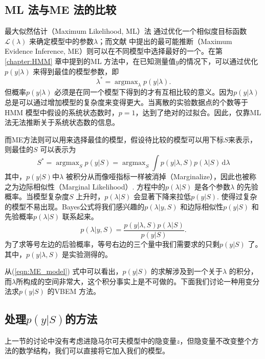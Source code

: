 \documentclass[11pt, a4paper]{article}
\DeclareMathOperator*{\argmax}{argmax}
\begin{document}
    \subsection{ML 法与ME 法的比较}
    最大似然估计（Maximum Likelihood, ML）法\cite{wiki:mle} 通过优化一个相似度目标函数$\mathcal L(\lambda)$ 来确定模型中的参数$\lambda$；而文献\cite{VBEM} 中提出的最可能推断（Maximum Evidence Inference, ME）则可以在不同模型中选择最好的一个。在第\ref{chapter:HMM} 章中提到的ML 方法中，在已知测量值$y$的情况下，可以通过优化$p(y|\lambda)$ 来得到最佳的模型参数，即
    \begin{equation}\label{eqn:ML_estimate}
      \lambda^* = \argmax_\lambda p(y| \lambda).
    \end{equation}
    但概率$p(y|\lambda)$ 必须是在同一个模型下得到的才有互相比较的意义。因为$p(y|\lambda)$ 总是可以通过增加模型的复杂度来变得更大。当离散的实验数据点的个数等于HMM 模型中假设的系统状态数时，$p=1$，达到了绝对的过拟合。因此，仅靠ML 法无法推断关于系统状态数的信息。

    而ME方法则可以用来选择最佳的模型，假设待比较的模型可以用下标$S$来表示，则最佳的$S$ 可以表示为
    \begin{equation}\label{eqn:ME_model}
      S^* = \argmax_S p(y| S) = \argmax_S \int p(y| \lambda, S)p(\lambda| S)\,\mathrm d\lambda
    \end{equation}
    其中，$p(y| S)$中$\lambda$ 被积分从而像哑指标一样被消掉（Marginalize），因此也被称之为边际相似性（Marginal Likelihood）. 方程中的$p(\lambda | S)$ 是各个参数$\lambda$ 的先验概率。当模型复杂度$S$ 上升时，$p(\lambda | S)$ 会显著下降来拉低$p(y| S)$. 使得过复杂的模型不易出现。Bayes公式将我们感兴趣的$p(\lambda|y,S)$ 和边际相似性$p(y|S)$ 和先验概率$p(\lambda|S)$ 联系起来。
    \begin{equation}\label{eqn:bayes_vbem}
      p(\lambda| y, S) = \frac{p(y| \lambda, S)p(\lambda| S)}{p(y| S)}.
    \end{equation}
    为了求等号左边的后验概率，等号右边的三个量中我们需要求的只剩$p(y| S)$ 了。其中，$p(y| \lambda, S)$ 是实验测得的。

    从(\ref{eqn:ME_model}) 式中可以看出，$p(y|S)$ 的求解涉及到一个关于$\lambda$ 的积分，而$\lambda$所构成的空间非常大，这个积分事实上是不可做的。下面我们讨论一种用变分法求$p(y|S)$ 的VBEM 方法。

    \subsection{处理$p(y|S)$的方法}
    上一节的讨论中没有考虑进隐马尔可夫模型中的隐变量$z$，但隐变量不改变整个方法的数学结构，我们可以直接将它加入我们的模型。
\end{document}
